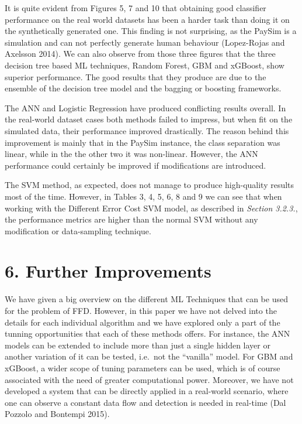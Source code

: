 \documentclass[12pt,]{article}
\begin{document}
It is quite evident from Figures 5, 7 and 10 that obtaining good
classifier performance on the real world datasets has been a harder task
than doing it on the synthetically generated one. This finding is not
surprising, as the PaySim is a simulation and can not perfectly generate
human behaviour (Lopez-Rojas and Axelsson 2014). We can also observe
from those three figures that the three decision tree based ML
techniques, Random Forest, GBM and xGBoost, show superior performance.
The good results that they produce are due to the ensemble of the
decision tree model and the bagging or boosting frameworks.

The ANN and Logistic Regression have produced conflicting results
overall. In the real-world dataset cases both methods failed to impress,
but when fit on the simulated data, their performance improved
drastically. The reason behind this improvement is mainly that in the
PaySim instance, the class separation was linear, while in the the other
two it was non-linear. However, the ANN performance could certainly be
improved if modifications are introduced.

The SVM method, as expected, does not manage to produce high-quality
results most of the time. However, in Tables 3, 4, 5, 6, 8 and 9 we can
see that when working with the Different Error Cost SVM model, as
described in \emph{Section 3.2.3.}, the performance metrics are higher
than the normal SVM without any modification or data-sampling technique.

\hypertarget{further-improvements}{%
\section{6. Further Improvements}\label{further-improvements}}

We have given a big overview on the different ML Techniques that can be
used for the problem of FFD. However, in this paper we have not delved
into the details for each individual algorithm and we have explored only
a part of the tunning opportunities that each of these methods offers.
For instance, the ANN models can be extended to include more than just a
single hidden layer or another variation of it can be tested, i.e.~not
the ``vanilla'' model. For GBM and xGBoost, a wider scope of tuning
parameters can be used, which is of course associated with the need of
greater computational power. Moreover, we have not developed a system
that can be directly applied in a real-world scenario, where one can
observe a constant data flow and detection is needed in real-time (Dal
Pozzolo and Bontempi 2015).
\end{document}
